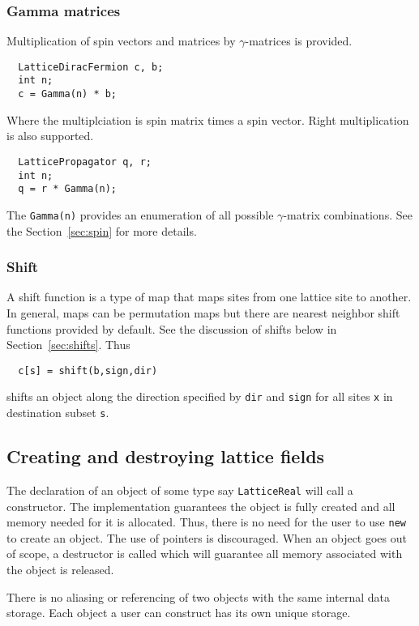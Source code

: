 \documentclass[12pt,letterpaper]{article}
\begin{document}
\subsubsection{Gamma matrices}

Multiplication of spin vectors and matrices by $\gamma$-matrices is provided.
%
\begin{verbatim}
  LatticeDiracFermion c, b;
  int n;
  c = Gamma(n) * b;
\end{verbatim}
%
Where the multiplciation is spin matrix times a spin vector. Right multiplication
is also supported.
\begin{verbatim}
  LatticePropagator q, r;
  int n;
  q = r * Gamma(n);
\end{verbatim}

The \verb|Gamma(n)| provides an enumeration of all possible
$\gamma$-matrix combinations.  See the Section~\ref{sec:spin} for more
details.

\subsubsection{Shift}

A shift function is a type of map that maps sites from one lattice
site to another. In general, maps can be permutation maps but there
are nearest neighbor shift functions provided by default.
See the discussion of shifts below
in Section~\ref{sec:shifts}.
Thus
%
\begin{verbatim}
  c[s] = shift(b,sign,dir)
\end{verbatim}
%
shifts an object along the direction specified by {\tt dir} and 
{\tt sign} for all sites {\tt x} in destination subset {\tt s}.


\subsection{Creating and destroying lattice fields}

The declaration of an object of some type say {\tt LatticeReal} will
call a constructor. The implementation guarantees the object is fully
created and all memory needed for it is allocated.  Thus, there is no
need for the user to use {\tt new} to create an object. The use of
pointers is discouraged.  When an object goes out of scope, a
destructor is called which will guarantee all memory associated with
the object is released.  

There is no aliasing or referencing of two objects with the same
internal data storage. Each object a user can construct has its own
unique storage.
\end{document}
